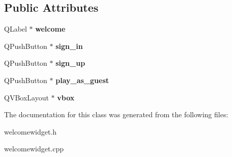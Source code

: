 \subsection*{Public Attributes}
\begin{DoxyCompactItemize}
\item 
\mbox{\label{classWelcomeWidget_a93e8348e5125d8f943a458a3bba6e04c}} 
Q\+Label $\ast$ {\bfseries welcome}
\item 
\mbox{\label{classWelcomeWidget_ade3d2c8f8343ce8bf4718168003bfc1a}} 
Q\+Push\+Button $\ast$ {\bfseries sign\+\_\+in}
\item 
\mbox{\label{classWelcomeWidget_a57a4b0610ec4496687566a8b9a253214}} 
Q\+Push\+Button $\ast$ {\bfseries sign\+\_\+up}
\item 
\mbox{\label{classWelcomeWidget_a9b0f37ee4e8ba6144ceadb7ed1df72a2}} 
Q\+Push\+Button $\ast$ {\bfseries play\+\_\+as\+\_\+guest}
\item 
\mbox{\label{classWelcomeWidget_aedf9c467575c6ddb2b2fcd31e1cdbaf8}} 
Q\+V\+Box\+Layout $\ast$ {\bfseries vbox}
\end{DoxyCompactItemize}


The documentation for this class was generated from the following files\+:\begin{DoxyCompactItemize}
\item 
welcomewidget.\+h\item 
welcomewidget.\+cpp\end{DoxyCompactItemize}
